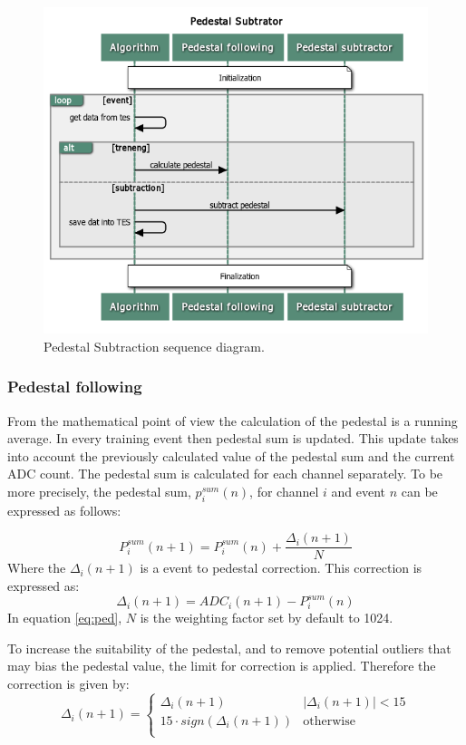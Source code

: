 \begin{figure}
\centering
\includegraphics[scale=0.6]{figures/Pedestal_Subtrator.png}
\caption{Pedestal Subtraction sequence diagram.}
\label{fig:ped}
\end{figure}



\subsubsection{Pedestal following}
From the mathematical point of view the calculation of the pedestal is a running average. In every training event then pedestal sum is updated. This update takes into account the previously calculated value of the pedestal sum and the current ADC count. The pedestal sum is calculated for each channel separately. To be more precisely, the pedestal sum, $p^{sum}_i(n)$, for channel $i$ and event $n$ can be expressed as follows:

\begin{equation}
P_{i}^{sum}(n+1)=P^{sum}_{i}(n) + \frac{\Delta_{i}(n+1)}{N}
\label{eq:ped}
\end{equation}
Where the $\Delta_{i}(n+1)$ is a event to pedestal correction. This correction is expressed as:
\begin{equation}
\Delta_{i}(n+1)=ADC_{i}(n+1)-P^{sum}_{i}(n)
\end{equation}
In equation \ref{eq:ped}, $N$ is the weighting factor set by default to 1024. 


To increase the suitability of the pedestal, and to remove potential outliers that may bias the pedestal value, the limit for correction is applied. Therefore the correction is given by:
\begin{equation} 
\Delta_{i}(n+1) =\left\{ \begin{array}{ll}
\Delta_{i}(n+1) & \left| \Delta_{i}(n+1) \right|<15 \\
 15 \cdot sign\left(\Delta_{i}(n+1)\right) & \textrm{otherwise}\\
\end{array} \right.
\end{equation}

